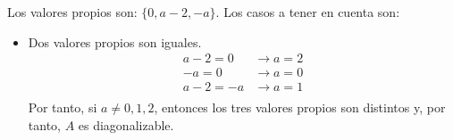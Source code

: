 \begin{ejercicio}
\begin{enumerate}
        Los valores propios son: $\{0,a-2,-a\}$. Los casos a tener en cuenta son:
       \begin{itemize}
           \item Dos valores propios son iguales.
           \begin{equation*} \begin{array}{ll}
               a-2=0 & \longrightarrow a=2 \\
               -a=0 & \longrightarrow a=0 \\
               a-2=-a & \longrightarrow a=1 \\
           \end{array}\end{equation*}
           Por tanto, si $a\neq0,1,2$, entonces los tres valores propios son distintos y, por tanto, $A$ es diagonalizable.
    

\end{itemize}
\end{enumerate}
\end{ejercicio}
